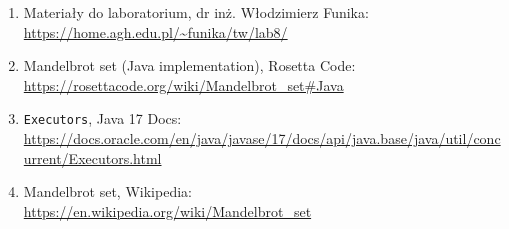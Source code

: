 \documentclass[11pt]{article}
\begin{document}
\begin{enumerate}
\def\labelenumi{\arabic{enumi}.}
\item
  Materiały do laboratorium, dr inż. Włodzimierz Funika:\\
  \url{https://home.agh.edu.pl/~funika/tw/lab8/}
\item
  Mandelbrot set (Java implementation), Rosetta Code:\\
  \url{https://rosettacode.org/wiki/Mandelbrot_set\#Java}
\item
  \texttt{Executors}, Java 17 Docs:\\
  \url{https://docs.oracle.com/en/java/javase/17/docs/api/java.base/java/util/concurrent/Executors.html}
\item
  Mandelbrot set, Wikipedia:\\
  \url{https://en.wikipedia.org/wiki/Mandelbrot_set}
\end{enumerate}


    
    
    
\end{document}
